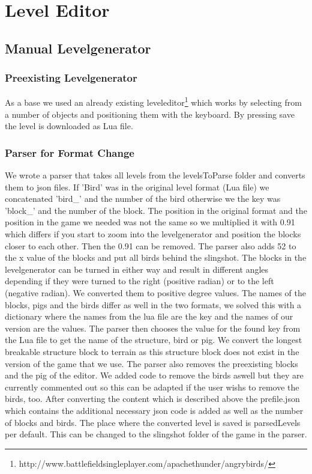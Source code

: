 \section{Level Editor}\label{ch:leveleditor}
\subsection{Manual Levelgenerator}
\subsubsection{Preexisting Levelgenerator}
As a base we used an already existing leveleditor\footnote{http://www.battlefieldsingleplayer.com/apachethunder/angrybirds/} which works by selecting from a number of objects and positioning them with the keyboard.
By pressing save the level is downloaded as Lua file. 
\subsubsection{Parser for Format Change}
We wrote a parser that takes all levels from the levelsToParse folder and converts them to json files.
If 'Bird' was in the original level format (Lua file) we concatenated 'bird\_' and the number of the bird otherwise we the key was 'block\_' and the number of the block.
The position in the original format and the position in the game we needed was not the same so we multiplied it with 0.91 which differs if you start to zoom into the levelgenerator and position the blocks closer to each other. Then the 0.91 can be removed. The parser also adds 52 to the x value of the blocks and put all birds behind the slingshot.
The blocks in the levelgenerator can be turned in either way and result in different angles depending if they were turned to the right (positive radian) or to the left (negative radian). We converted them to positive degree values.
The names of the blocks, pigs and the birds differ as well in the two formats, we solved this with a dictionary where the names from the lua file are the key and the names of our version are the values. The parser then chooses the value for the found key from the Lua file to get the name of the structure, bird or pig. We convert the longest breakable structure block to terrain as this structure block does not exist in the version of the game that we use.
The parser also removes the preexisting blocks and the pig of the editor. We added code to remove the birds aswell but they are currently commented out so this can be adapted if the user wishs to remove the birds, too.
After converting the content which is described above the prefile.json which contains the additional necessary json code is added as well as the number of blocks and birds.
The place where the converted level is saved is parsedLevels per default. This can be changed to the slingshot folder of the game in the parser. 

